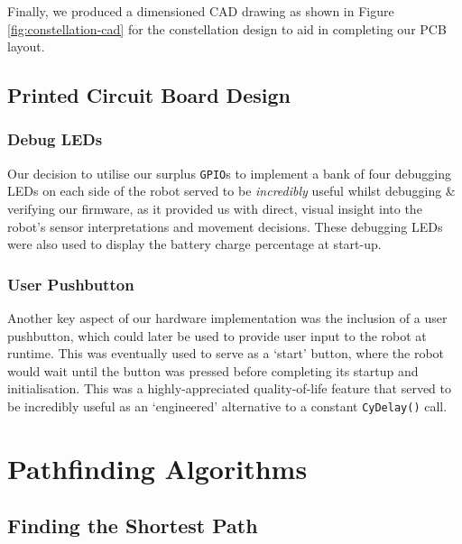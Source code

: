 \documentclass[conference]{IEEEtran}
\begin{document}
Finally, we produced a dimensioned CAD drawing as shown in Figure \ref{fig:constellation-cad} for the constellation design to aid in completing our PCB layout.

\subsection{Printed Circuit Board Design}


\subsubsection{Debug LEDs}

Our decision to utilise our surplus \texttt{GPIO}s to implement a bank of four debugging LEDs on each side of the robot served to be \emph{incredibly} useful whilst debugging \& verifying our firmware, as it provided us with direct, visual insight into the robot's sensor interpretations and movement decisions.
These debugging LEDs were also used to display the battery charge percentage at start-up.

\subsubsection{User Pushbutton}

Another key aspect of our hardware implementation was the inclusion of a user pushbutton, which could later be used to provide user input to the robot at runtime.
This was eventually used to serve as a `start' button, where the robot would wait until the button was pressed before completing its startup and initialisation.
This was a highly-appreciated quality-of-life feature that served to be incredibly useful as an `engineered' alternative to a constant \texttt{CyDelay()} call.



\section{Pathfinding Algorithms \label{sect-pathfinding-algorithms}}

\subsection{Finding the Shortest Path}
\end{document}
